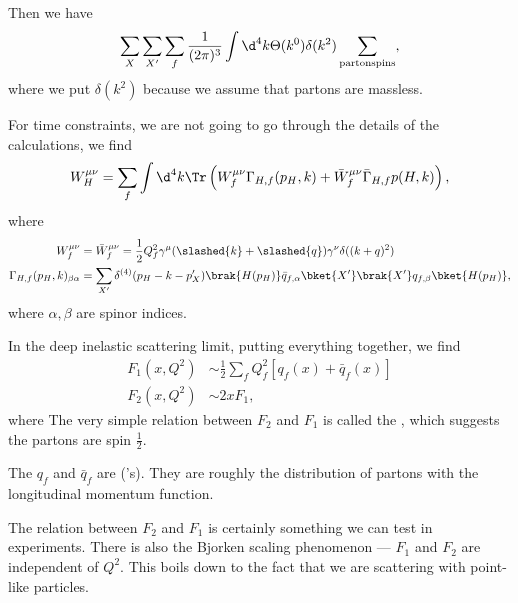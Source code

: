 \documentclass[a4paper]{article}
\begin{document}

Then we have
\[
  \sum_X \sum_{X'} \sum_f \frac{1}{(2\pi)^3} \int \d^4 k \Theta(k^0) \delta(k^2) \sum_{\mathrm{parton spins}}, %
\]
where we put $\delta(k^2)$ because we assume that partons are massless.

For time constraints, we are not going to go through the details of the calculations, we find
\[
  W_H^{\mu\nu} = \sum_f \int \d^4 k \Tr\left(W_f^{\mu\nu} \Gamma_{H, f} (p_H, k) + \bar{W}_f^{\mu\nu} \bar{\Gamma}_{H, f} p(H, k)\right),
\]
where
\begin{align*}
  W_f^{\mu\nu} &= \bar{W}_f^{\mu\nu} = \frac{1}{2} Q_f^2 \gamma^\mu (\slashed{k} + \slashed{q}) \gamma^\nu \delta((k + q)^2)\\
  \Gamma_{H, f} (p_H, k)_{\beta\alpha} &= \sum_{X'} \delta^{(4)} (p_H - k - p_X') \brak{H(p_H)} \bar{q}_{f, \alpha} \bket{X'} \brak{X'}q_{f, \beta}\bket{H(p_H)},
\end{align*}
where $\alpha, \beta$ are spinor indices.

In the deep inelastic scattering limit, putting everything together, we find
\begin{align*}
  F_1(x, Q^2) &\sim \frac{1}{2} \sum_f Q_f^2 [ q_f(x) + \bar{q}_f(x)]\\
  F_2(x, Q^2) &\sim 2 x F_1,
\end{align*}
where
The very simple relation between $F_2$ and $F_1$ is called the , which suggests the partons are spin $\frac{1}{2}$.

The $q_f$ and $\bar{q}_f$ are  ('s). They are roughly the distribution of partons with the longitudinal momentum function. %

The relation between $F_2$ and $F_1$ is certainly something we can test in experiments. There is also the Bjorken scaling phenomenon --- $F_1$ and $F_2$ are independent of $Q^2$. This boils down to the fact that we are scattering with point-like particles.
\end{document}
